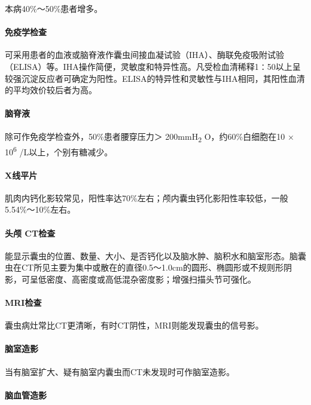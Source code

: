 本病40\%～50\%患者增多。

\paragraph{免疫学检查}

可采用患者的血液或脑脊液作囊虫间接血凝试验（IHA）、酶联免疫吸附试验（ELISA）等。IHA操作简便，灵敏度和特异性高。凡受检血清稀释1∶50以上呈较强沉淀反应者可确定为阳性。ELISA的特异性和灵敏性与IHA相同，其阳性血清的平均效价较后者为高。

\paragraph{脑脊液}

除可作免疫学检查外，50\%患者腰穿压力＞ 200mmH\textsubscript{2}
O，约60\%白细胞在10 × 10\textsuperscript{6} /L以上，个别有糖减少。

\paragraph{X线平片}

肌肉内钙化影较常见，阳性率达70\%左右；颅内囊虫钙化影阳性率较低，一般5.54\%～10\%左右。

\paragraph{头颅 CT检查}

能显示囊虫的位置、数量、大小、是否钙化以及脑水肿、脑积水和脑室形态。脑囊虫在CT所见主要为集中或散在的直径0.5～1.0cm的圆形、椭圆形或不规则形阴影，可呈低密度、高密度或高低混杂密度影；增强扫描头节可强化。

\paragraph{MRI检查}

囊虫病灶常比CT更清晰，有时CT阴性，MRI则能发现囊虫的信号影。

\paragraph{脑室造影}

当有脑室扩大、疑有脑室内囊虫而CT未发现时可作脑室造影。

\paragraph{脑血管造影}

